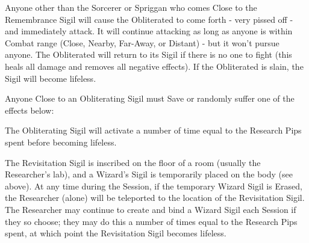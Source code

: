 Anyone other than the Sorcerer or Spriggan who comes Close to the Remembrance Sigil will cause the Obliterated to come forth - very pissed off - and immediately attack.  It will continue attacking as long as anyone is within Combat range (Close, Nearby, Far-Away, or Distant) - but it won't pursue anyone.  The Obliterated will return to its Sigil if there is no one to fight (this heals all damage and removes all negative effects).  If the Obliterated is slain, the Sigil will become lifeless.

\cbreak


Anyone Close to an Obliterating Sigil must Save or randomly suffer one of the effects below:


The Obliterating Sigil will activate a number of time equal to the Research Pips spent before becoming lifeless.



The Revisitation Sigil is inscribed on the floor of a room (usually the Researcher's lab), and a Wizard's Sigil is temporarily placed on the body (see above). At any time during the Session, if the temporary Wizard Sigil is Erased, the Researcher (alone) will be teleported to the location of the Revisitation Sigil. The Researcher may continue to create and bind a Wizard Sigil each Session if they so choose; they may do this a number of times equal to the Research Pips spent, at which point the Revisitation Sigil becomes lifeless. 



\newpage
